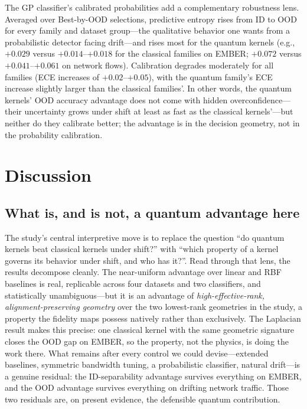 \documentclass[journal]{IEEEtran}
\begin{document}
The GP classifier's calibrated probabilities add a complementary robustness lens. Averaged over Best-by-OOD selections, predictive entropy rises from ID to OOD for every family and dataset group---the qualitative behavior one wants from a probabilistic detector facing drift---and rises most for the quantum kernels (e.g., $+0.029$ versus $+0.014$--$+0.018$ for the classical families on EMBER; $+0.072$ versus $+0.041$--$+0.061$ on network flows). Calibration degrades moderately for all families (ECE increases of $+0.02$--$+0.05$), with the quantum family's ECE increase slightly larger than the classical families'. In other words, the quantum kernels' OOD accuracy advantage does not come with hidden overconfidence---their uncertainty grows under shift at least as fast as the classical kernels'---but neither do they calibrate better; the advantage is in the decision geometry, not in the probability calibration.

\section{Discussion}
\label{sec:discussion}

\subsection{What is, and is not, a quantum advantage here}

The study's central interpretive move is to replace the question ``do quantum kernels beat classical kernels under shift?'' with ``which property of a kernel governs its behavior under shift, and who has it?''. Read through that lens, the results decompose cleanly. The near-uniform advantage over linear and RBF baselines is real, replicable across four datasets and two classifiers, and statistically unambiguous---but it is an advantage of \emph{high-effective-rank, alignment-preserving geometry} over the two lowest-rank geometries in the study, a property the fidelity maps possess natively rather than exclusively. The Laplacian result makes this precise: one classical kernel with the same geometric signature closes the OOD gap on EMBER, so the property, not the physics, is doing the work there. What remains after every control we could devise---extended baselines, symmetric bandwidth tuning, a probabilistic classifier, natural drift---is a genuine residual: the ID-separability advantage survives everything on EMBER, and the OOD advantage survives everything on drifting network traffic. Those two residuals are, on present evidence, the defensible quantum contribution.
\end{document}
